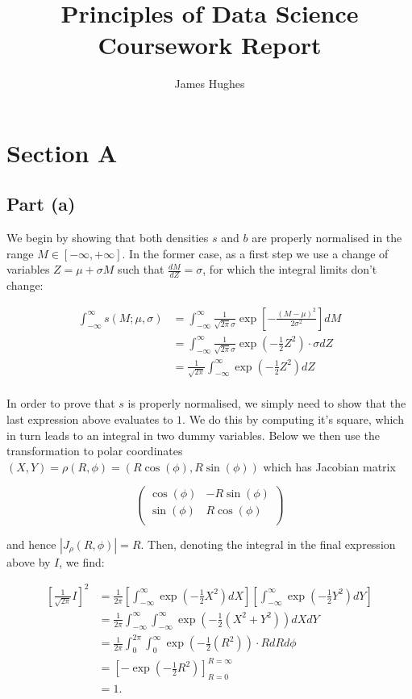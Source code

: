 \documentclass[12pt]{article}
\title{Principles of Data Science Coursework Report}
\author{James Hughes}
\begin{document}
\maketitle
\newpage


\section{Section A}

\subsection{Part (a)}

We begin by showing that both densities $s$ and $b$ are properly normalised in the range $M\in [-\infty, +\infty]$. In the former case, as a first step we use a change of variables $Z = \mu + \sigma M$ such that $\frac{dM}{dZ} = \sigma$, for which the integral limits don't change:

\begin{align*}
    \int_{-\infty}^\infty s(M;\mu, \sigma) & = \int_{-\infty}^\infty \frac{1}{\sqrt{2\pi}\sigma}\exp \left[-\frac{(M-\mu)^2}{2\sigma^2}\right]dM\\
        & = \int_{-\infty}^\infty \frac{1}{\sqrt{2\pi}\sigma}\exp(-\frac{1}{2}Z^2)\cdot \sigma dZ\\
        & = \frac{1}{\sqrt{2\pi}}\int_{-\infty}^\infty\exp(-\frac{1}{2}Z^2)dZ\\
\end{align*}

In order to prove that $s$ is properly normalised, we simply need to show that the last expression above evaluates to $1$. We do this by computing it's square, which in turn leads to an integral in two dummy variables. Below we then use the transformation to polar coordinates $(X,Y) = \rho(R,\phi) = (R\cos(\phi), R\sin(\phi))$ which has Jacobian matrix

\[
    \begin{pmatrix}
        \cos(\phi) & -R\sin(\phi) \\
        \sin(\phi) & R\cos(\phi) \\
    \end{pmatrix}
\]

and hence $|J_\rho(R,\phi)| = R$. Then, denoting the integral in the final expression above by $I$, we find:

\begin{align*}
    \left[\frac{1}{\sqrt{2\pi}}I\right]^2 & = \frac{1}{2\pi}\left[\int_{-\infty}^\infty\exp(-\frac{1}{2}X^2)dX\right]\left[\int_{-\infty}^\infty\exp(-\frac{1}{2}Y^2)dY\right] \\
        & = \frac{1}{2\pi}\int_{-\infty}^\infty\int_{-\infty}^\infty\exp(-\frac{1}{2}(X^2 + Y^2))dXdY\\
        & = \frac{1}{2\pi}\int_{0}^{2\pi}\int_{0}^\infty\exp(-\frac{1}{2}(R^2))\cdot R dRd\phi\\
        & = \left[-\exp(-\frac{1}{2}R^2)\right]_{R=0}^{R=\infty} \\
        & = 1. \\
\end{align*}
\end{document}

